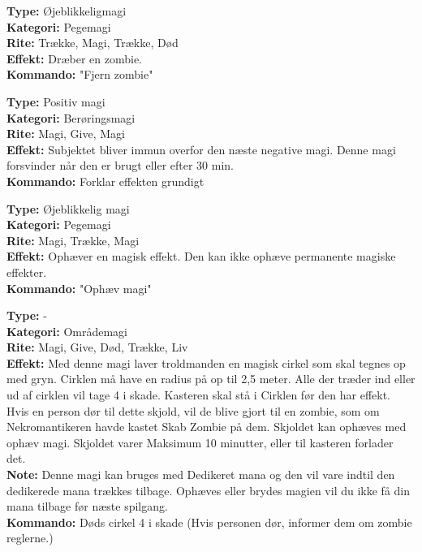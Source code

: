 \begin{primærMagi*}
\textbf{Type:} Øjeblikkeligmagi\\
\textbf{Kategori:} Pegemagi\\
\textbf{Rite:} Trække, Magi, Trække, Død\\
\textbf{Effekt:} Dræber en zombie.\\
\textbf{Kommando:} "Fjern zombie"
\end{primærMagi*}

\begin{primærMagi*}
\textbf{Type:} Positiv magi\\
\textbf{Kategori:} Berøringsmagi\\
\textbf{Rite:} Magi, Give, Magi\\
\textbf{Effekt:} Subjektet bliver immun overfor den næste negative magi. Denne magi forsvinder når den er brugt eller efter 30 min.\\
\textbf{Kommando:} Forklar effekten grundigt
\end{primærMagi*}

\begin{primærMagi*}
\textbf{Type:} Øjeblikkelig magi\\
\textbf{Kategori:} Pegemagi\\
\textbf{Rite:} Magi, Trække, Magi\\
\textbf{Effekt:} Ophæver en magisk effekt. Den kan ikke ophæve permanente magiske effekter.\\
\textbf{Kommando:} "Ophæv magi"
\end{primærMagi*}

\begin{primærMagi*}
\textbf{Type:} -\\
\textbf{Kategori:} Områdemagi \\
\textbf{Rite:} Magi, Give, Død, Trække, Liv \\
\textbf{Effekt:} Med denne magi laver troldmanden en magisk cirkel som skal tegnes op med gryn. Cirklen må have en radius på op til 2,5 meter. Alle der træder ind eller ud af cirklen vil tage 4 i skade. Kasteren skal stå i Cirklen før den har effekt. Hvis en person dør til dette skjold, vil de blive gjort til en zombie, som om Nekromantikeren havde kastet Skab Zombie på dem. Skjoldet kan ophæves med ophæv magi. Skjoldet varer Maksimum 10 minutter, eller til kasteren forlader det.\\ 
\textbf{Note:} Denne magi kan bruges med Dedikeret mana og den vil vare indtil den dedikerede mana trækkes tilbage. Ophæves eller brydes magien vil du ikke få din mana tilbage før næste spilgang.\\
\textbf{Kommando:} Døds cirkel 4 i skade (Hvis personen dør, informer dem om zombie reglerne.)
\end{primærMagi*}

